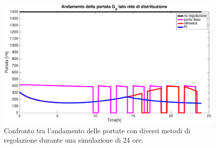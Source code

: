 \documentclass[laurea,oneside,11pt]{USiena_tesiLM3}
\begin{document}
\begin{figure}[!ht]
\centering
\includegraphics[width=\textwidth]{figure/portate_confronto} 
\caption{Confronto tra l'andamento delle portate con diversi metodi di regolazione durante una simulazione di 24 ore.}
\label{fig:portate_confronto}
\end{figure}
\end{document}
